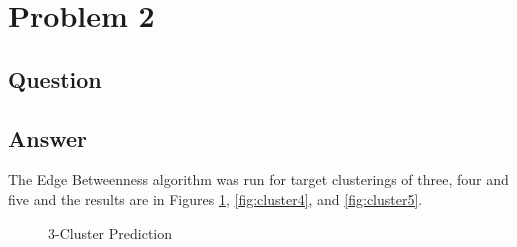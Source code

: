 \section{Problem 2}

\subsection{Question}
\vspace*{10pt}


\subsection{Answer}
The Edge Betweenness algorithm was run for target clusterings of three, four and five and the results are in Figures \ref{fig:cluster3}, \ref{fig:cluster4}, and \ref{fig:cluster5}.

\begin{figure}[h!]
\centering
{}
\caption{3-Cluster Prediction}
\label{fig:cluster3}
\end{figure}

